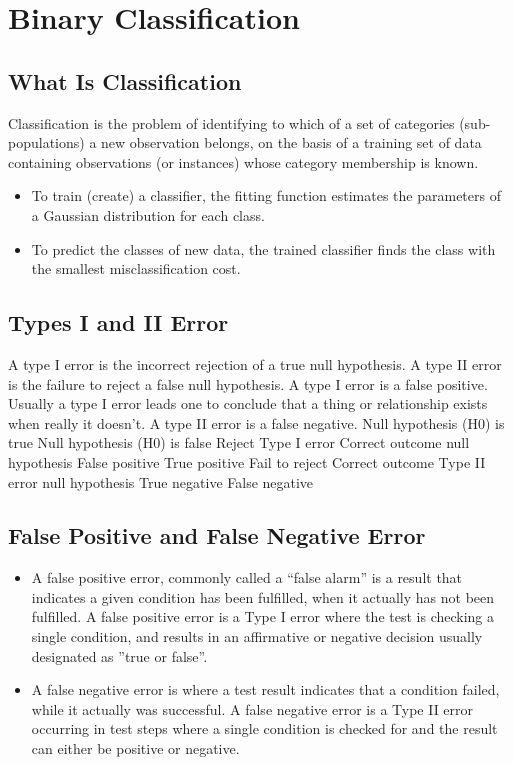 \section*{Binary Classification}
\subsection*{What Is Classification}
Classification is the problem of identifying to which of a set of categories
(sub-populations) a new observation belongs, on the basis of a training set
of data containing observations (or instances) whose category membership is
known. 

\begin{itemize}
\item  To train (create) a classifier, the fitting function estimates the parameters
of a Gaussian distribution for each class.
\item  To predict the classes of new data, the trained classifier finds the class
with the smallest misclassification cost.
\end{itemize}
\subsection*{Types I and II Error}
A type I error is the incorrect rejection of a true null hypothesis. A type
II error is the failure to reject a false null hypothesis. A type I error is a
false positive. Usually a type I error leads one to conclude that a thing or
relationship exists when really it doesn’t. A type II error is a false negative.
Null hypothesis (H0) is true Null hypothesis (H0) is false
Reject Type I error Correct outcome
null hypothesis False positive True positive
Fail to reject Correct outcome Type II error
null hypothesis True negative False negative
\subsection*{False Positive and False Negative Error}

\begin{itemize}
	\item 
	A false positive error, commonly called a “false alarm” is a result that indicates
	a given condition has been fulfilled, when it actually has not been
	fulfilled. A false positive error is a Type I error where the test is checking
	a single condition, and results in an affirmative or negative decision usually
	designated as ”true or false”.
	\item  A false negative error is where a test result indicates that a condition
	failed, while it actually was successful. A false negative error is a Type II
	error occurring in test steps where a single condition is checked for and the
	result can either be positive or negative.
\end{itemize}

